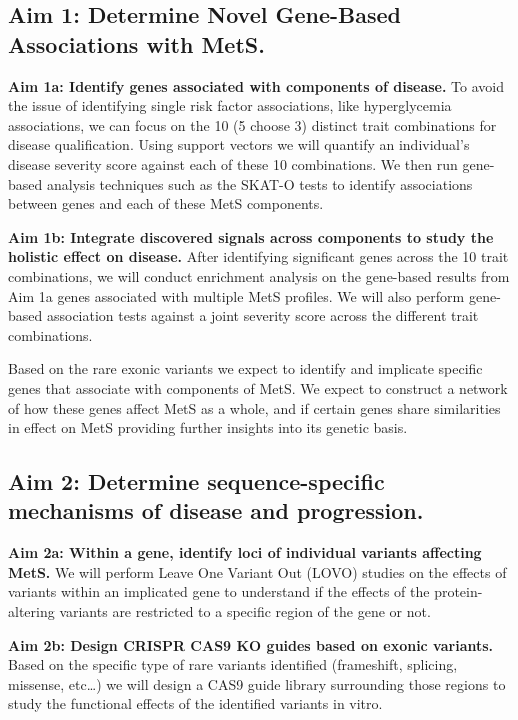 \documentclass[11pt]{article}
\begin{document}
\subsection*{Aim 1: Determine Novel Gene-Based Associations with MetS.}

\textbf{Aim 1a: Identify genes associated with components of disease.} To avoid the issue of identifying single risk factor associations, like hyperglycemia associations, we can focus on the 10 (5 choose 3) distinct trait combinations for disease qualification. Using support vectors we will quantify an individual's disease severity score against each of these 10 combinations. We then run gene-based analysis techniques such as the SKAT-O tests to identify associations between genes and each of these MetS components.

\textbf{Aim 1b: Integrate discovered signals across components to study the holistic effect on disease.} After identifying significant genes across the 10 trait combinations, we will conduct enrichment analysis on the gene-based results from Aim 1a genes associated with multiple MetS profiles. We will also perform gene-based association tests against a joint severity score across the different trait combinations.

Based on the rare exonic variants we expect to identify and implicate specific genes that associate with components of MetS. We expect to construct a network of how these genes affect MetS as a whole, and if certain genes share similarities in effect on MetS providing further insights into its genetic basis.

\subsection*{Aim 2: Determine sequence-specific mechanisms of disease and progression.}

\textbf{Aim 2a: Within a gene, identify loci of individual variants affecting MetS.} We will perform Leave One Variant Out (LOVO) studies on the effects of variants within an implicated gene to understand if the effects of the protein-altering variants are restricted to a specific region of the gene or not.

\textbf{Aim 2b: Design CRISPR CAS9 KO guides based on exonic variants.} Based on the specific type of rare variants identified (frameshift, splicing, missense, etc…) we will design a CAS9 guide library surrounding those regions to study the functional effects of the identified variants in vitro.
\end{document}
